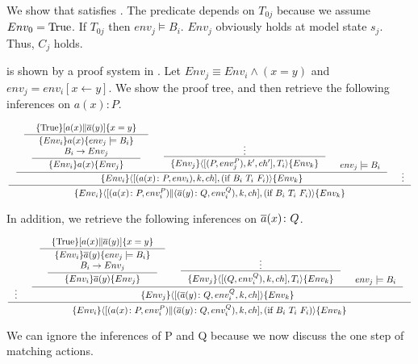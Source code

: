 \documentclass[12pt,a4paper,titlepage]{article}
\theoremstyle{break}
\begin{document}
We show that \NHK satisfies .
The predicate depends on \(T_{0j}\) because we assume \(Env_0=\mathop{\mathrm{True}}\nolimits\).
If \(T_{0j}\) then \(env_j\models B_i\).
\(Env_j\) obviously holds at model state \(s_j\).
Thus, \(C_j\) holds.

 is shown by a proof system in .
Let \(Env_j\equiv Env_i\wedge(x=y)\) and \(env_j=env_i[x\leftarrow y]\).
We show the proof tree, and then retrieve the following inferences on \(a(x)\colon P\).
  \begin{center}
    \begin{math}
\inference{
  \inference{
    \inference{\{\Truerm\}[a(x)\|\bijection{a}(y)]\{x=y\}}
    {\inference{\{Env_i\}a(x)\{env_j\models B_i\}\\
                  B_i\rightarrow Env_j} {\{Env_i\}a(x)\{Env_j\}}}&
     \inference{\vdots}
     {\{Env_j\}\langle[(P,env_j^P),k',ch'],T_i\rangle\{Env_k\}}&env_j\models B_i}
  {\{Env_i\}\langle[(a(x)\colon P,env_i),k,ch],(\mbox{if}\ B_i\ T_i\ F_i)\rangle\{Env_k\}}&\vdots}
{\{Env_i\}\langle[(a(x)\colon P,env_i^P)\|(\bijection{a}(y)\colon Q,env_i^Q),k,ch],(\mbox{if}\ B_i\ T_i\ F_i)\rangle\{Env_k\}}
    \end{math}
  \end{center}
In addition, we retrieve the following inferences on \(\mbox{$\overline{a}$}(x)\colon Q\).
  \begin{center}
    \begin{math}
\inference{
  \vdots&
    \inference{\inference{\{\Truerm\}[a(x)\|\bijection{a}(y)]\{x=y\}}
               {\inference{\{Env_i\}\bijection{a}(y)\{env_j\models B_i\}\\B_i\rightarrow Env_j}
                {\{Env_i\}\bijection{a}(y)\{Env_j\}}}&
                   \inference{\vdots}
                   {\{Env_j\}\langle[(Q,env_i^Q),k,ch],T_i\rangle\{Env_k\}}&env_j\models B_i}
   {\{Env_j\}\langle[(\bijection{a}(y)\colon Q,env_i^Q,k,ch]\rangle\{Env_k\}}}
{\{Env_i\}\langle[(a(x)\colon P,env_i^P)\|(\bijection{a}(y)\colon Q,env_i^Q),k,ch],(\mbox{if}\ B_i\ T_i\ F_i)\rangle\{Env_k\}}
    \end{math}
  \end{center}
We can ignore the inferences of P and Q because we now discuss the one step of matching actions.
\end{document}
